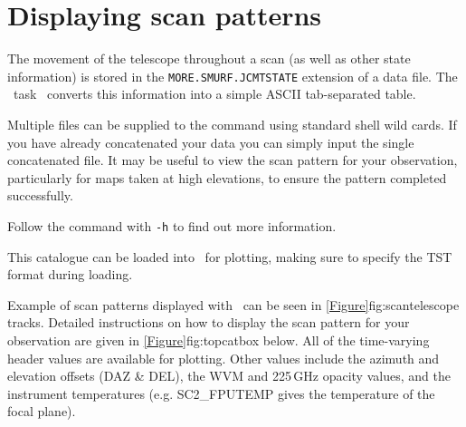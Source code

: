 \documentclass[11pt,oneside,chapters]{starlink}
\begin{document}
\section{Displaying scan patterns}
\label{sec:scan}

The movement of the telescope throughout a scan (as well as other
state information) is stored in the \texttt{MORE.SMURF.JCMTSTATE}
extension of a data file. The \smurf\ task \jcmtstate\ converts this
information into a simple ASCII tab-separated table.

\begin{terminalv}
\end{terminalv}

Multiple files can be supplied to the command using standard shell wild
cards. If you have already
concatenated your data you can simply input the single concatenated
file. It may be useful to view the scan pattern for your
observation, particularly for maps taken at high elevations, to ensure
the pattern completed successfully.


\begin{tip}
Follow the  command with \texttt{-h} to find out more information.
\end{tip}


This catalogue can be loaded into \topcat\ for plotting, making sure
to specify the TST format during loading.

\begin{terminalv}
\end{terminalv}

Example of scan patterns displayed with \topcat\ can be seen in
\cref{Figure}{fig:scan}{telescope tracks}. Detailed instructions on
how to display the scan pattern for your observation are given in
\cref{Figure}{fig:topcat}{box below}.
All of the time-varying header values are available for plotting. Other
values include the azimuth and elevation offsets (DAZ \& DEL), the WVM
and 225\,GHz opacity values, and the instrument temperatures (e.g.
SC2\_FPUTEMP gives the temperature of the focal plane).

\end{document}
